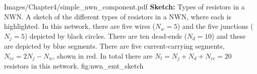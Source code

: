 \begin{comment}
\fig{1}
{Images/Chapter4/simple_nwn_component_final.pdf}
{\textbf{Sketch:} Types of resistors in a NWN.}
{(a) A sketch of a NWN and (b) the different types of resistors highlighted in the network. In this network, there are five wires ($N_w = 5$) and the five junctions ($N_j = 5$) depicted by black circles. There are ten dead-ends ($N_d  = 10$) and these are depicted by blue segments. There are five current-carrying segments, $N_{cc} = 2 N_j - N_w$, shown in red. In total there are $N_t = N_j+ N_d + N_{cc} = 20$ resistors in this network.}
{fig:nwn_emt_sketch}
\end{comment}
{Images/Chapter4/simple_nwn_component.pdf}
{\textbf{Sketch:} Types of resistors in a NWN.}
{A sketch of the different types of resistors in a NWN, where each is highlighted. In this network, there are five wires ($N_w = 5$) and the five junctions ($N_j = 5$) depicted by black circles. There are ten dead-ends ($N_d  = 10$) and these are depicted by blue segments. There are five current-carrying segments, $N_{cc} = 2 N_j - N_w$, shown in red. In total there are $N_t = N_j+ N_d + N_{cc} = 20$ resistors in this network.}
{fig:nwn_emt_sketch}


